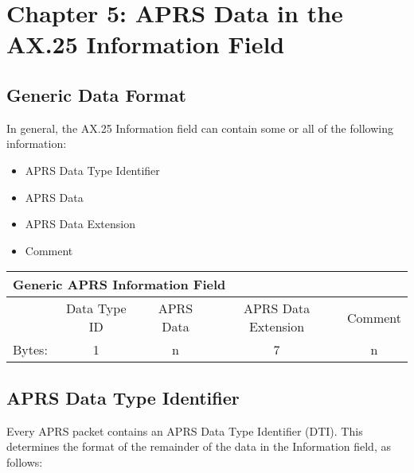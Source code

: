 \chapter {Chapter 5: APRS Data in the AX.25 Information Field}

\section {Generic Data Format}

In general, the AX.25 Information field can contain some or all of the
following information:
\begin{itemize}
\item  APRS Data Type Identifier
\item  APRS Data
\item  APRS Data Extension
\item  Comment
\end{itemize}


\begin{tabular}{|l|c|c|c|c|}
  \hline
  \hline
  \multicolumn{5}{|l|}{Generic APRS Information Field} \\
  \hline
  & Data Type ID & APRS Data & APRS Data Extension & Comment \\
  \hline 
  Bytes: & 1            & n         & 7                   & n \\
  \hline
\end{tabular}



\section{APRS Data Type Identifier}

Every APRS packet contains an APRS Data Type Identifier (DTI). This
determines the format of the remainder of the data in the Information field, as
follows:


